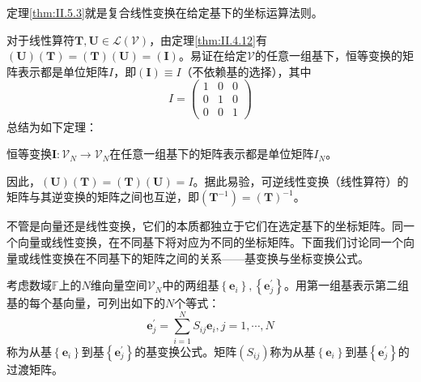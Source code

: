 \documentclass[main.tex]{subfiles}
\begin{document}
定理\ref{thm:II.5.3}就是复合线性变换在给定基下的坐标运算法则。

对于线性算符$\mathbf{T},\mathbf{U}\in\mathcal{L}\left(\mathcal{V}\right)$，由定理\ref{thm:II.4.12}有$\left(\mathbf{U}\right)\left(\mathbf{T}\right)=\left(\mathbf{T}\right)\left(\mathbf{U}\right)=\left(\mathbf{I}\right)$。易证在给定$\mathcal{V}$的任意一组基下，恒等变换的矩阵表示都是单位矩阵$I$，即$\left(\mathbf{I}\right)\equiv I$（不依赖基的选择），其中
\[I=\begin{pmatrix}1&0&0\\0&1&0\\0&0&1\end{pmatrix}\]
总结为如下定理：
\begin{theorem}
恒等变换$\mathbf{I}:\mathcal{V}_N\rightarrow\mathcal{V}_N$在任意一组基下的矩阵表示都是单位矩阵$I_N$。
\end{theorem}
因此，$\left(\mathbf{U}\right)\left(\mathbf{T}\right)=\left(\mathbf{T}\right)\left(\mathbf{U}\right)=I$。据此易验，可逆线性变换（线性算符）的矩阵与其逆变换的矩阵之间也互逆，即$\left(\mathbf{T}^{-1}\right)=\left(\mathbf{T}\right)^{-1}$。

不管是向量还是线性变换，它们的本质都独立于它们在选定基下的坐标矩阵。同一个向量或线性变换，在不同基下将对应为不同的坐标矩阵。下面我们讨论同一个向量或线性变换在不同基下的矩阵之间的关系——基变换与坐标变换公式。

考虑数域$\mathbb{F}$上的$N$维向量空间$\mathcal{V}_N$中的两组基$\left\{\mathbf{e}_i\right\},\left\{\mathbf{e}^\prime_j\right\}$。用第一组基表示第二组基的每个基向量，可列出如下的$N$个等式：
\[\mathbf{e}^\prime_j=\sum_{i=1}^NS_{ij}\mathbf{e}_i,j=1,\cdots,N\]
称为从基$\left\{\mathbf{e}_i\right\}$到基$\left\{\mathbf{e}^\prime_j\right\}$的基变换公式。矩阵$\left(S_{ij}\right)$称为从基$\left\{\mathbf{e}_i\right\}$到基$\left\{\mathbf{e}^\prime_j\right\}$的过渡矩阵。
\end{document}
